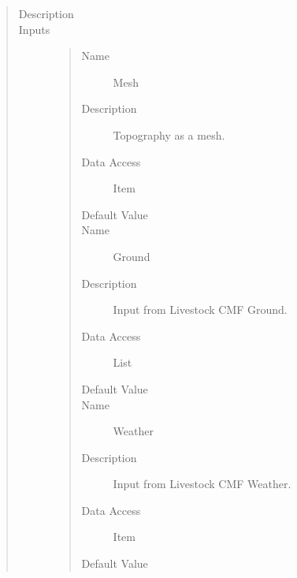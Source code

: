 \documentclass[letterpaper,10pt,english]{sphinxmanual}
\begin{document}
\begin{quote}\begin{description}
\item[{Description}] \leavevmode
{}

\item[{Inputs}] \leavevmode\begin{quote}\begin{description}
\item[{Name}] \leavevmode
Mesh

\item[{Description}] \leavevmode
Topography as a mesh.

\item[{Data Access}] \leavevmode
Item

\item[{Default Value}] \leavevmode
{}

\item[{Name}] \leavevmode
Ground

\item[{Description}] \leavevmode
Input from Livestock CMF Ground.

\item[{Data Access}] \leavevmode
List

\item[{Default Value}] \leavevmode
{}

\item[{Name}] \leavevmode
Weather

\item[{Description}] \leavevmode
Input from Livestock CMF Weather.

\item[{Data Access}] \leavevmode
Item

\item[{Default Value}] \leavevmode
{}


\end{description}
\end{quote}
\end{description}
\end{quote}
\end{document}
